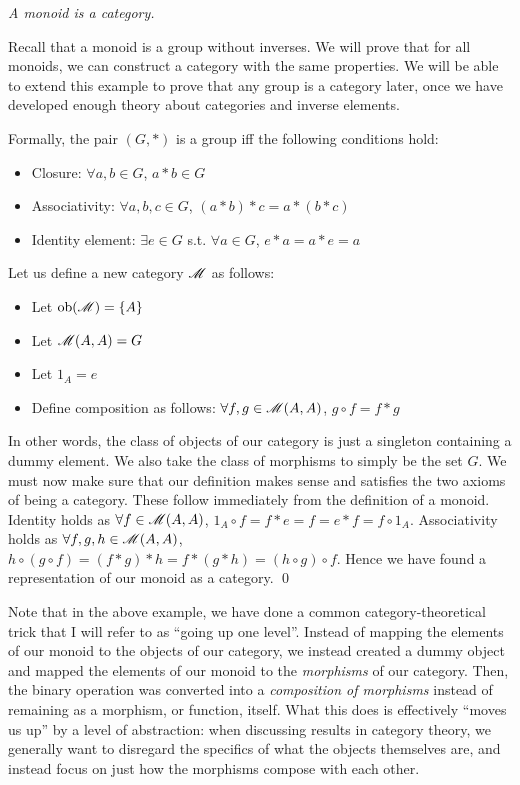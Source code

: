 \documentclass[../thesis.tex]{subfiles}
\begin{document}
\begin{ex}
\label{ex:monoid}
\textit{A monoid is a category.}

Recall that a monoid is a group without inverses.
We will prove that for all monoids, we can construct a category with the same properties.
We will be able to extend this example to prove that any group is a category later, once we have developed enough theory about categories and inverse elements.

Formally, the pair $(G,*)$ is a group iff the following conditions hold:
\begin{itemize}
    \item Closure: $\forall a,b\in G$, $a*b\in G$
    \item Associativity: $\forall a,b,c \in G$, $(a*b)*c=a*(b*c)$
    \item Identity element: $\exists e\in G$ s.t. $\forall a\in G$, $e*a=a*e=a$
\end{itemize}

Let us define a new category $\mathscr{M}$ as follows:
\begin{itemize}
    \item Let $\operatorname{ob}(\mathscr{M}) = \{A\}$
    \item Let $\mathscr{M}(A,A) = G$
    \item Let $1_A=e$
    \item Define composition as follows: $\forall f,g\in \mathscr{M}(A,A)$, $g\circ f = f*g$
\end{itemize}

In other words, the class of objects of our category is just a singleton containing a dummy element.
We also take the class of morphisms to simply be the set $G$.
We must now make sure that our definition makes sense and satisfies the two axioms of being a category.
These follow immediately from the definition of a monoid.
Identity holds as $\forall f\in \mathscr{M}(A,A)$, $1_A \circ f = f*e = f = e*f = f \circ 1_A$.
Associativity holds as $\forall f,g,h\in \mathscr{M}(A,A)$, $h \circ (g \circ f) = (f*g)*h = f*(g*h) = (h \circ g) \circ f$.
Hence we have found a representation of our monoid as a category.
\qed
\end{ex}

Note that in the above example, we have done a common category-theoretical trick that I will refer to as ``going up one level''.
Instead of mapping the elements of our monoid to the objects of our category, we instead created a dummy object and mapped the elements of our monoid to the \textit{morphisms} of our category.
Then, the binary operation was converted into a \textit{composition of morphisms} instead of remaining as a morphism, or function, itself.
What this does is effectively ``moves us up'' by a level of abstraction: when discussing results in category theory, we generally want to disregard the specifics of what the objects themselves are, and instead focus on just how the morphisms compose with each other.
\end{document}
